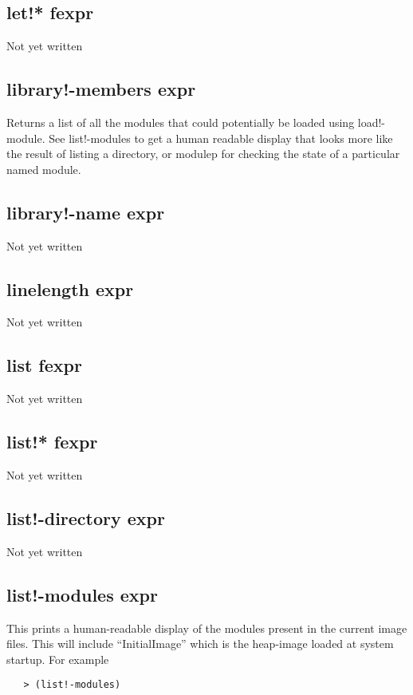 \documentclass[a4paper,11pt]{article}
\begin{document}
{\subsection{\ttfamily let!* fexpr}
   Not yet written

\subsection{\ttfamily library!-members expr}
   Returns a list of all the modules that could potentially be loaded using
   {\ttfamily load!-module}. See {\ttfamily list!-modules} to get a human
   readable display that looks more like the result of listing a directory, or
   {\ttfamily modulep} for checking the state of a particular named module.
  

\subsection{\ttfamily library!-name expr}
   Not yet written

\subsection{\ttfamily linelength expr}
   Not yet written

\subsection{\ttfamily list fexpr}
   Not yet written

\subsection{\ttfamily list!* fexpr}
   Not yet written

\subsection{\ttfamily list!-directory expr}
   Not yet written
  

\subsection{\ttfamily list!-modules expr}
   This prints a human-readable display of the modules present in the current
   image files. This will include ``InitialImage'' which is the heap-image
   loaded at system startup. For example
   \begin{verbatim}
   > (list!-modules)
  

\end{verbatim}}
\end{document}
